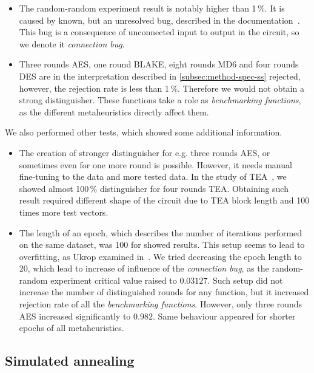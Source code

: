 \documentclass[
  print, %
  Table,   %
  nolof,     %
  nolot,     %
  11pt, %
  oneside  %
]{fithesis3}
\begin{document}
\begin{itemize}
    \item The random-random experiment result is notably higher than 1\,\%. It is caused by known, but an unresolved bug, described in the documentation~\cite{EACirc-wiki-bug}. This bug is a consequence of unconnected input to output in the circuit, so we denote it \textit{connection bug}.
    \item Three rounds AES, one round BLAKE, eight rounds MD6 and four rounds DES are in the interpretation described in \cref{subsec:method-spec-ss} rejected, however, the rejection rate is less than 1\,\%. Therefore we would not obtain a strong distinguisher. These functions take a role as \textit{benchmarking functions}, as the different metaheuristics directly affect them.
\end{itemize}

We also performed other tests, which showed some additional information.

\begin{itemize}
    \item The creation of stronger distinguisher for e.g. three rounds AES, or sometimes even for one more round is possible. However, it needs manual fine-tuning to the data and more tested data. In the study of TEA~\cite{kubicek2016new}, we showed almost 100\,\% distinguisher for four rounds TEA. Obtaining such result required different shape of the circuit due to TEA block length and 100 times more test vectors.
    \item The length of an epoch, which describes the number of iterations performed on the same dataset, was 100 for showed results. This setup seems to lead to overfitting, as Ukrop examined in~\cite[section~7.1]{ukropBcThesis}. We tried decreasing the epoch length to 20, which lead to increase of influence of the \textit{connection bug}, as the random-random experiment critical value raised to $0.03127$. Such setup did not increase the number of distinguished rounds for any function, but it increased rejection rate of all the \textit{benchmarking functions}. However, only three rounds AES increased significantly to $0.982$. Same behaviour appeared for shorter epochs of all metaheuristics.
\end{itemize}


\subsection{Simulated annealing}
\label{subsec:res-ss-sa}
\end{document}
